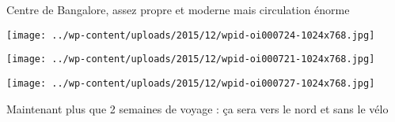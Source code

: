 Centre de Bangalore, assez propre et moderne mais circulation énorme 
\begin{center} \texttt{[image: ../wp-content/uploads/2015/12/wpid-oi000724-1024x768.jpg]} \end{center}
\begin{center} \texttt{[image: ../wp-content/uploads/2015/12/wpid-oi000721-1024x768.jpg]} \end{center}
\begin{center} \texttt{[image: ../wp-content/uploads/2015/12/wpid-oi000727-1024x768.jpg]} \end{center}

Maintenant plus que 2 semaines de voyage : ça sera vers le nord et sans le vélo
